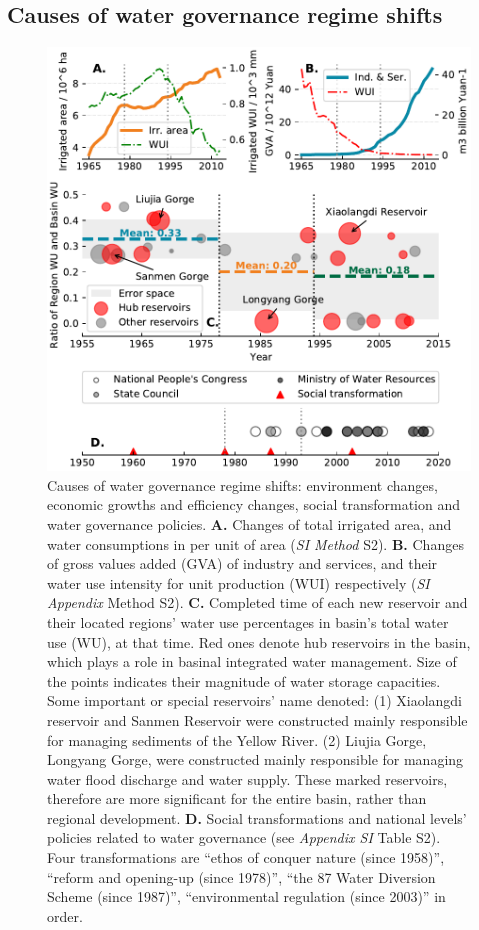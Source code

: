 \documentclass[9pt, twocolumn, twoside, lineno]{pnas-new}
\begin{document}
\subsection*{Causes of water governance regime shifts}
\label{result2}

\begin{figure}[th!]
	\centering
	\includegraphics[width=\linewidth]{../../figures/main/causes.pdf}
	\caption{
		Causes of water governance regime shifts: environment changes, economic growths and efficiency changes, social transformation and water governance policies.
		\textbf{A.} Changes of total irrigated area, and water consumptions in per unit of area (\textit{SI Method} S2).
		\textbf{B.} Changes of gross values added (GVA) of industry and services, and their water use intensity for unit production (WUI) respectively (\textit{SI Appendix} Method S2).
		\textbf{C.} Completed time of each new reservoir and their located regions' water use percentages in basin's total water use (WU), at that time. Red ones denote hub reservoirs in the basin, which plays a role in basinal integrated water management. Size of the points indicates their magnitude of water storage capacities. Some important or special reservoirs' name denoted: (1) Xiaolangdi reservoir and Sanmen Reservoir were constructed mainly responsible for managing sediments of the Yellow River. (2) Liujia Gorge, Longyang Gorge, were constructed mainly responsible for managing water flood discharge and water supply. These marked reservoirs, therefore are more significant for the entire basin, rather than regional development.
		\textbf{D.} Social transformations and national levels' policies related to water governance (see \textit{Appendix SI} Table S2). Four transformations are ``ethos of conquer nature (since 1958)'', ``reform and opening-up (since 1978)'', ``the 87 Water Diversion Scheme (since 1987)'', ``environmental regulation (since 2003)'' in order.
	}
	\label{fig:Causes}
\end{figure}
\end{document}
